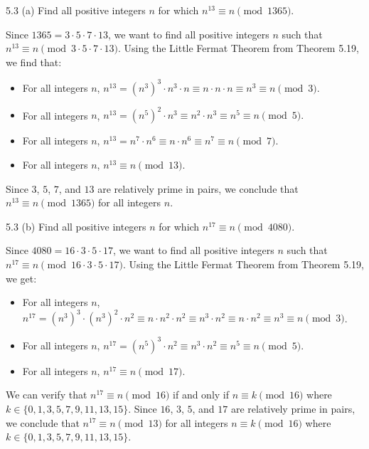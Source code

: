 \begin{exercise}{5.3 (a)}
  Find all positive integers \( n \) for which \( n^{13} \equiv n
  \pmod{1365} \).
\end{exercise}

\begin{solution}
  Since \( 1365 = 3 \cdot 5 \cdot 7 \cdot 13 \), we want to find all
  positive integers \( n \) such that \( n^{13} \equiv n \pmod{3 \cdot
    5 \cdot 7 \cdot 13} \). Using the Little Fermat Theorem from
  Theorem 5.19, we find that:
  \begin{itemize}
  \item
    For all integers \( n \), \( n^{13} = \left( n^3 \right)^3 \cdot
    n^3 \cdot n \equiv n \cdot n \cdot n \equiv n^3 \equiv n \pmod{3}.
    \)
  \item
    For all integers \( n \), \( n^{13} = \left( n^5 \right)^2 \cdot
    n^3 \equiv n^2 \cdot n^3 \equiv n^5 \equiv n \pmod{5}. \)
  \item
    For all integers \( n \), \( n^{13} = n^7 \cdot n^6 \equiv n \cdot
    n^6 \equiv n^7 \equiv n \pmod{7}. \)
  \item
    For all integers \( n \), \( n^{13} \equiv n \pmod{13}. \)
  \end{itemize}
  Since \( 3 \), \( 5 \), \( 7 \), and \( 13 \) are relatively prime
  in pairs, we conclude that \( n^{13} \equiv n \pmod{1365} \) for all
  integers \( n \).
\end{solution}


\begin{exercise}{5.3 (b)}
  Find all positive integers \( n \) for which \( n^{17} \equiv n
  \pmod{4080} \).
\end{exercise}

\begin{solution}
  Since \( 4080 = 16 \cdot 3 \cdot 5 \cdot 17 \), we want to find all
  positive integers \( n \) such that \( n^{17} \equiv n \pmod{16
    \cdot 3 \cdot 5 \cdot 17} \). Using the Little Fermat Theorem from
  Theorem 5.19, we get:
  \begin{itemize}
  \item
    For all integers \( n \), \( n^{17} = \left( n^3 \right)^3 \cdot
    \left( n^3 \right)^2 \cdot n^2 \equiv n \cdot n^2 \cdot n^2 \equiv
    n^3 \cdot n^2 \equiv n \cdot n^2 \equiv n^3 \equiv n \pmod{3} \).
  \item
    For all integers \( n \), \( n^{17} = \left( n^{5} \right)^3 \cdot
    n^2 \equiv n^3 \cdot n^2 \equiv n^5 \equiv n \pmod{5} \).
  \item
    For all integers \( n \), \( n^{17} \equiv n \pmod{17} \).
  \end{itemize}
  We can verify that \( n^{17} \equiv n \pmod{16} \) if and only if \(
  n \equiv k \pmod{16} \) where \( k \in \{ 0, 1, 3, 5, 7, 9, 11, 13,
  15 \} \). Since \( 16 \), \( 3 \), \( 5 \), and \( 17 \) are
  relatively prime in pairs, we conclude that \( n^{17} \equiv n
  \pmod{13} \) for all integers \( n \equiv k \pmod{16} \) where \( k
  \in \{ 0, 1, 3, 5, 7, 9, 11, 13, 15 \} \).
\end{solution}


